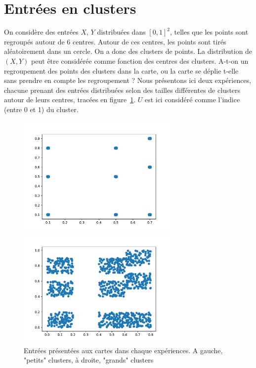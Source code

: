 \section{Entrées en clusters}

On considère des entrées $X$, $Y$ distribuées dans $[0,1]^2$, telles que les points sont regroupés autour de 6 centres. Autour de ces centres, les points sont tirés aléatoirement dans un cercle. On a donc des clusters de points. La distribution de $(X,Y)$ peut être considérée comme fonction des centres des clusters.  A-t-on un regroupement des points des clusters dans la carte, ou la carte se déplie t-elle sans prendre en compte les regroupement ? Nous présentons ici deux expériences, chacune prenant des entrées distribuées selon des tailles différentes de clusters autour de leurs centres, tracées en figure~\ref{fig:cluster_in}.  $U$ est ici considéré comme l'indice (entre 0 et 1) du cluster.

\begin{figure}[h!]
\begin{minipage}{0.5\textwidth}
\centering\includegraphics[width=0.7\textwidth]{2som_cluster_in}
\end{minipage}
\begin{minipage}{0.5\textwidth}
\centering\includegraphics[width=0.7\textwidth]{2som_cluster001_in}
\end{minipage}
\caption{Entrées présentées aux cartes dans chaque expériences. A gauche, "petits" clusters, à droite, "grands" clusters}
\label{fig:cluster_in}
\end{figure}



